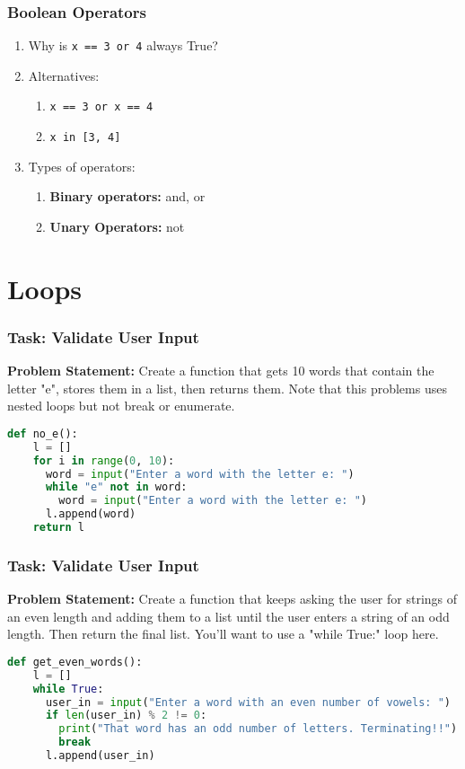 \documentclass[xcolor=table]{beamer}
\begin{document}
%
%
\begin{frame}[fragile]
	\frametitle{Boolean Operators}
	\begin{enumerate}[A]
		\item Why is \lstinline|x == 3 or 4| always True?
		\item Alternatives:
			\begin{enumerate}
				\item \lstinline|x == 3 or x == 4|
				\item \lstinline|x in [3, 4]|
			\end{enumerate}
		\item Types of operators:
			\begin{enumerate}
				\item \textbf{Binary operators:} and, or
				\item \textbf{Unary Operators: } not
			\end{enumerate}
	\end{enumerate}
\end{frame}

\section{Loops}


%
%
\begin{frame}[fragile]
  \frametitle{Task: Validate User Input}
  \textbf{Problem Statement:} Create a function that gets 10 words that contain the letter "e", stores them in a list, then returns them. Note that this problems uses nested loops but not break or enumerate.
  \vfill
  \pause
  \begin{lstlisting}[language=Python, autogobble, basicstyle=\tiny]
  def no_e():
    l = []
    for i in range(0, 10):
      word = input("Enter a word with the letter e: ")
      while "e" not in word:
        word = input("Enter a word with the letter e: ")
      l.append(word)
    return l
  \end{lstlisting}
\end{frame}

%
%
\begin{frame}[fragile]
  \frametitle{Task: Validate User Input}
  \textbf{Problem Statement:} Create a function that keeps asking the user for strings of an even length and adding them to a list until the user enters a string of an odd length. Then return the final list. You'll want to use a "while True:" loop here.
  \vfill
  \pause
  \begin{lstlisting}[language=Python, autogobble, basicstyle=\tiny]
  def get_even_words():
    l = []
    while True:
      user_in = input("Enter a word with an even number of vowels: ")
      if len(user_in) % 2 != 0:
        print("That word has an odd number of letters. Terminating!!")
        break
      l.append(user_in)
  \end{lstlisting}
\end{frame}
\end{document}
